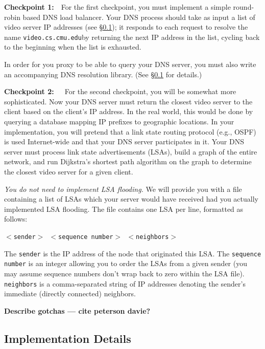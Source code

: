 \documentclass{article}
\newcommand{\theurl}{\texttt{video.cs.cmu.edu}}
\begin{document}
\bigskip \noindent \textbf{Checkpoint 1:}~~For the first checkpoint, you must
implement a simple round-robin based DNS load balancer. Your DNS process should
take as input a list of video server IP addresses (see \S\ref{sec:dns-details});
it responds to each request to resolve the name \theurl by returning the next
IP address in the list, cycling back to the beginning when the list is
exhausted.

In order for you proxy to be able to query your DNS server, you must also write
an accompanying DNS resolution library. (See \S\ref{sec:dns-details} for
details.)



\bigskip \noindent \textbf{Checkpoint 2:}~~~For the second checkpoint, you will
be somewhat more sophisticated. Now your DNS server must return the closest
video server to the client based on the client's IP address. In the real world,
this would be done by querying a database mapping IP prefixes to geographic
locations. In your implementation, you will pretend that a link state routing
protocol (e.g., OSPF) is used Internet-wide and that your DNS server
participates in it. Your DNS server must process link state advertisements
(LSAs), build a graph of the entire network, and run Dijkstra's shortest path
algorithm on the graph to determine the closest video server for a given
client.

\emph{You do not need to implement LSA flooding.} We will provide you with a
file containing a list of LSAs which your server would have received had you
actually implemented LSA flooding.  The file contains one LSA per line,
formatted as follows:
\begin{center}
	\texttt{$<$sender$>$ $<$sequence number$>$ $<$neighbors$>$}
\end{center}
The \texttt{sender} is the IP address of the node that originated this LSA. The
\texttt{sequence number} is an integer allowing you to order the LSAs from a
given sender (you may assume sequence numbers don't wrap back to zero within
the LSA file). \texttt{neighbors} is a comma-separated string of IP addresses
denoting the sender's immediate (directly connected) neighbors.

\textbf{Describe gotchas --- cite peterson
davie?} 


\subsection{Implementation Details}
\label{sec:dns-details}
\end{document}
